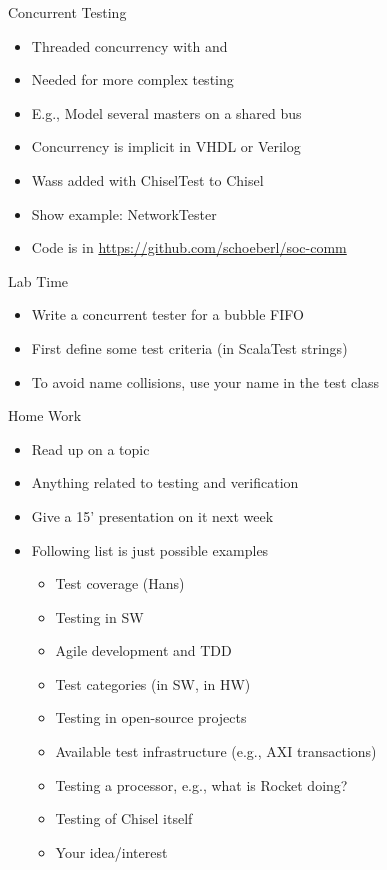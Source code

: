 \begin{frame}[fragile]{Concurrent Testing}
\begin{itemize}
\item Threaded concurrency with  and 
\item Needed for more complex testing
\item E.g., Model several masters on a shared bus
\item Concurrency is implicit in VHDL or Verilog
\item Wass added with ChiselTest to Chisel
\item Show example: NetworkTester
\item Code is in \url{https://github.com/schoeberl/soc-comm}
\end{itemize}
\end{frame}

\begin{frame}[fragile]{Lab Time}
\begin{itemize}
\item Write a concurrent tester for a bubble FIFO
\item First define some test criteria (in ScalaTest strings)
\item To avoid name collisions, use your name in the test class
\end{itemize}
\end{frame}

\begin{frame}[fragile]{Home Work}
\begin{itemize}
\item Read up on a topic
\item Anything related to testing and verification
\item Give a 15' presentation on it next week
\item Following list is just possible examples
\begin{itemize}
\item Test coverage (Hans)
\item Testing in SW
\item Agile development and TDD
\item Test categories (in SW, in HW)
\item Testing in open-source projects
\item Available test infrastructure (e.g., AXI transactions)
\item Testing a processor, e.g., what is Rocket doing?
\item Testing of Chisel itself
\item Your idea/interest
\end{itemize}
\end{itemize}
\end{frame}


